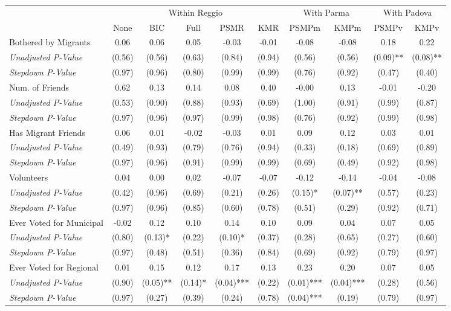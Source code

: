 \begin{tabular}{l c c c c c c c c c}
\toprule
& \multicolumn{5}{c}{Within Reggio} & \multicolumn{2}{c}{With Parma} & \multicolumn{2}{c}{With Padova} \\\cmidrule(lr){2-6} \cmidrule(lr){7-8} \cmidrule(lr){9-10}
 & None & BIC & Full & PSMR & KMR & PSMPm & KMPm & PSMPv & KMPv \\
\midrule
Bothered by Migrants & 0.06 & 0.06 & 0.05 & -0.03 & -0.01 & -0.08 & -0.08 & 0.18 & 0.22 \\
\quad \textit{Unadjusted P-Value} & (0.56) & (0.56) & (0.63) & (0.84) & (0.94) & (0.56) & (0.56) & (0.09)** & (0.08)** \\
\quad \textit{Stepdown P-Value} & (0.97) & (0.96) & (0.80) & (0.99) & (0.99) & (0.76) & (0.92) & (0.47) & (0.40) \\
Num. of Friends & 0.62 & 0.13 & 0.14 & 0.08 & 0.40 & -0.00 & 0.13 & -0.01 & -0.20 \\
\quad \textit{Unadjusted P-Value} & (0.53) & (0.90) & (0.88) & (0.93) & (0.69) & (1.00) & (0.91) & (0.99) & (0.87) \\
\quad \textit{Stepdown P-Value} & (0.97) & (0.96) & (0.97) & (0.99) & (0.98) & (0.76) & (0.92) & (0.99) & (0.98) \\
Has Migrant Friends & 0.06 & 0.01 & -0.02 & -0.03 & 0.01 & 0.09 & 0.12 & 0.03 & 0.01 \\
\quad \textit{Unadjusted P-Value} & (0.49) & (0.93) & (0.79) & (0.76) & (0.94) & (0.33) & (0.18) & (0.69) & (0.89) \\
\quad \textit{Stepdown P-Value} & (0.97) & (0.96) & (0.91) & (0.99) & (0.99) & (0.69) & (0.49) & (0.92) & (0.98) \\
Volunteers & 0.04 & 0.00 & 0.02 & -0.07 & -0.07 & -0.12 & -0.14 & -0.04 & -0.08 \\
\quad \textit{Unadjusted P-Value} & (0.42) & (0.96) & (0.69) & (0.21) & (0.26) & (0.15)* & (0.07)** & (0.57) & (0.23) \\
\quad \textit{Stepdown P-Value} & (0.97) & (0.96) & (0.85) & (0.60) & (0.78) & (0.51) & (0.29) & (0.92) & (0.71) \\
Ever Voted for Municipal & -0.02 & 0.12 & 0.10 & 0.14 & 0.10 & 0.09 & 0.04 & 0.07 & 0.05 \\
\quad \textit{Unadjusted P-Value} & (0.80) & (0.13)* & (0.22) & (0.10)* & (0.37) & (0.28) & (0.65) & (0.27) & (0.60) \\
\quad \textit{Stepdown P-Value} & (0.97) & (0.48) & (0.51) & (0.36) & (0.84) & (0.69) & (0.92) & (0.79) & (0.97) \\
Ever Voted for Regional & 0.01 & 0.15 & 0.12 & 0.17 & 0.13 & 0.23 & 0.20 & 0.07 & 0.05 \\
\quad \textit{Unadjusted P-Value} & (0.90) & (0.05)** & (0.14)* & (0.04)*** & (0.22) & (0.01)*** & (0.04)*** & (0.28) & (0.56) \\
\quad \textit{Stepdown P-Value} & (0.97) & (0.27) & (0.39) & (0.24) & (0.78) & (0.04)*** & (0.19) & (0.79) & (0.97) \\
\bottomrule
\end{tabular}

